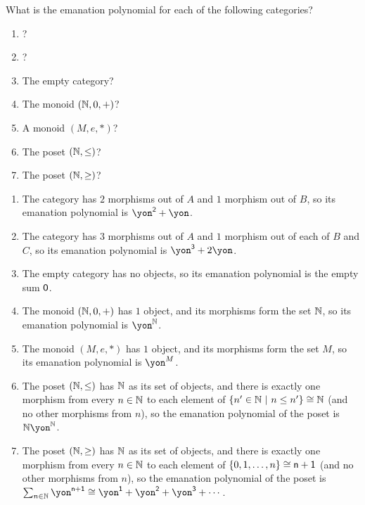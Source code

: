 \documentclass[Book-Poly]{subfiles}
\begin{document}
\begin{exercise} \label{exc.ema_polys}
What is the emanation polynomial for each of the following categories?
\begin{enumerate}
	\item {}?
	\item {}?
	\item The empty category?
	\item \label{exc.ema_polys.nat_monoid} The monoid $(\mathbb{N},0,+)$?
	\item A monoid $(M, e, *)$?
	\item \label{exc.ema_polys.nat_poset} The poset $(\mathbb{N},\leq)$?
	\item The poset $(\mathbb{N},\geq)$?
\qedhere
\end{enumerate}
\begin{solution}
\begin{enumerate}
	\item The category  has $2$ morphisms out of $A$ and $1$ morphism out of $B$, so its emanation polynomial is $\yon^\2 + \yon$.
	\item The category  has $3$ morphisms out of $A$ and $1$ morphism out of each of $B$ and $C$, so its emanation polynomial is $\yon^\3 + 2\yon$.
	\item The empty category has no objects, so its emanation polynomial is the empty sum $\textsf{0}$.
	\item The monoid $(\mathbb{N},0,+)$ has $1$ object, and its morphisms form the set $\mathbb{N}$, so its emanation polynomial is $\yon^\nn$.
	\item The monoid $(M, e, *)$ has $1$ object, and its morphisms form the set $M$, so its emanation polynomial is $\yon^M$.
	\item The poset $(\mathbb{N},\leq)$ has $\mathbb{N}$ as its set of objects, and there is exactly one morphism from every $n \in \mathbb{N}$ to each element of $\{n' \in \nn \ | \ n \leq n'\} \iso \nn$ (and no other morphisms from $n$), so the emanation polynomial of the poset is $\nn\yon^\nn$.
	\item The poset $(\mathbb{N},\geq)$ has $\mathbb{N}$ as its set of objects, and there is exactly one morphism from every $n \in \mathbb{N}$ to each element of $\{0, 1, \ldots, n\} \cong \mathsf{n}+\textsf{1}$ (and no other morphisms from $n$), so the emanation polynomial of the poset is $\sum_{n \in \nn} \yon^{\ord{n}+\1} \iso \yon^\1 + \yon^\2 + \yon^\3 + \cdots$.
\end{enumerate}
\end{solution}
\end{exercise}
\end{document}
